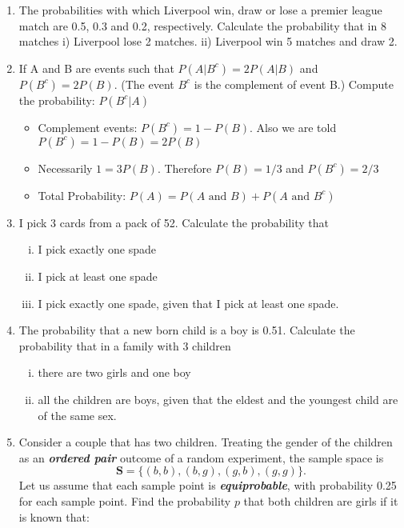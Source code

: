 \documentclass[a4paper,12pt]{article}
\begin{document}
\begin{enumerate}
\item	The probabilities with which Liverpool win, draw or lose a premier league match are 0.5, 0.3 and 0.2, respectively. Calculate the probability that in 8 matches
	i)	Liverpool lose 2 matches.
	ii)	Liverpool win 5 matches and draw 2.
\item %
If A and B are events such that $P(A|B^c) = 2P(A|B)$ and $P(B^c) = 2P(B)$.
(The event $B^c$ is the complement of event B.) Compute the probability: $P(B^c|A)$ 
\begin{framed}
\begin{itemize}
\item Complement events: $P(B^c) = 1 - P(B)$. Also we are told $P(B^c) = 1-P(B)= 2P(B)$
\item Necessarily $1 = 3P(B)$. Therefore $P(B) = 1/3$ and  $P(B^c)=2/3$
\item Total Probability: $P(A) = P(A \mbox{ and } B) + P(A \mbox{ and } B^c)$
\end{itemize}
\end{framed}

\item I pick 3 cards from a pack of 52. Calculate the probability that 
\begin{enumerate}[(i)]
\item I pick exactly one spade
\item I pick at least one spade
\item I pick exactly one spade, given that I pick at least one spade.
\end{enumerate}

\item The probability that a new born child is a boy is 0.51. Calculate the probability that in a family with 3 children
\begin{enumerate}[(i)]
\item there are two girls and one boy
\item all the children are boys, given that the eldest and the youngest child are of the same sex.
\end{enumerate}

\item 
Consider a couple that has two children. Treating the gender of the children as an \textit{\textbf{ordered pair}} outcome of a random experiment, the sample space is 
\[\boldsymbol{S} = \{ (b,b), (b,g), (g,b), (g,g)\}.\]
Let us assume that each sample point is \textit{\textbf{equiprobable}}, with probability 0.25 for each sample point.
Find the probability $p$ that both children are girls if it is known that: 


\end{enumerate}
\end{document}
